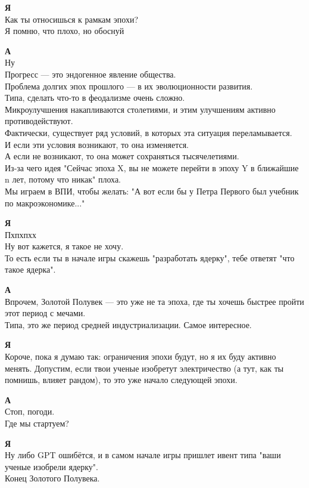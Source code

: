 \textbf{Я} \\
Как ты относишься к рамкам эпохи? \\
Я помню, что плохо, но обоснуй

\textbf{А} \\
Ну \\
Прогресс — это эндогенное явление общества. \\
Проблема долгих эпох прошлого — в их эволюционности развития. \\
Типа, сделать что-то в феодализме очень сложно. \\
Микроулучшения накапливаются столетиями, и этим улучшениям активно противодействуют. \\
Фактически, существует ряд условий, в которых эта ситуация переламывается. \\
И если эти условия возникают, то она изменяется. \\
А если не возникают, то она может сохраняться тысячелетиями. \\
Из-за чего идея "Сейчас эпоха X, вы не можете перейти в эпоху Y в ближайшие n лет, потому что никак" плоха. \\
Мы играем в ВПИ, чтобы желать: "А вот если бы у Петра Первого был учебник по макроэкономике..."

\textbf{Я} \\
Пхпхпхх \\
Ну вот кажется, я такое не хочу. \\
То есть если ты в начале игры скажешь "разработать ядерку", тебе ответят "что такое ядерка".

\textbf{А} \\
Впрочем, Золотой Полувек — это уже не та эпоха, где ты хочешь быстрее пройти этот период с мечами. \\
Типа, это же период средней индустриализации. Самое интересное.

\textbf{Я} \\
Короче, пока я думаю так: ограничения эпохи будут, но я их буду активно менять. Допустим, если твои ученые изобретут электричество (а тут, как ты помнишь, влияет рандом), то это уже начало следующей эпохи.

\textbf{А} \\
Стоп, погоди. \\
Где мы стартуем?

\textbf{Я} \\
Ну либо GPT ошибётся, и в самом начале игры пришлет ивент типа "ваши ученые изобрели ядерку". \\
Конец Золотого Полувека.

